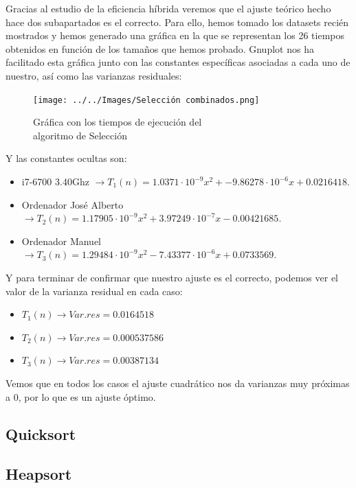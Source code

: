 \documentclass[10pt,a4paper]{article}
\begin{document}
Gracias al estudio de la eficiencia híbrida veremos que el ajuste teórico hecho hace dos subapartados es el correcto. Para ello, hemos tomado los datasets recién mostrados y hemos generado una gráfica en la que se representan los 26 tiempos obtenidos en función de los tamaños que hemos probado. Gnuplot nos ha facilitado esta gráfica junto con las constantes específicas asociadas a cada uno de nuestro, así como las varianzas residuales:

\begin{figure}[h!]
	\centering
	\texttt{[image: ../../Images/Selección combinados.png]}
	\caption{Gráfica con los tiempos de ejecución del \\algoritmo de Selección}
\end{figure}

Y las constantes ocultas son:
\begin{itemize}
	\item i7-6700 3.40Ghz \(\rightarrow T_1(n) = 1.0371 \cdot 10^{-9} x^2 + -9.86278 \cdot 10^{-6} x +0.0216418\).
	\item Ordenador José Alberto \(\rightarrow T_2(n) = 1.17905 \cdot 10^{-9} x^2 + 3.97249 \cdot 10^{-7} x - 0.00421685\).
	\item Ordenador Manuel \(\rightarrow T_3(n) = 1.29484 \cdot 10^{-9} x^2 - 7.43377 \cdot 10^{-6} x + 0.0733569\).
\end{itemize}

Y para terminar de confirmar que nuestro ajuste es el correcto, podemos ver el valor de la varianza residual en cada caso:

\begin{itemize}
	\item \(T_1(n) \longrightarrow Var.res = 0.0164518\)
	\item \(T_2(n) \longrightarrow Var.res = 0.000537586\)
	\item \(T_3(n) \longrightarrow Var.res = 0.00387134\)
\end{itemize}

Vemos que en todos los casos el ajuste cuadrático nos da varianzas muy próximas a 0, por lo que es un ajuste óptimo.

\subsection{Quicksort}
\subsection{Heapsort}
\end{document}
